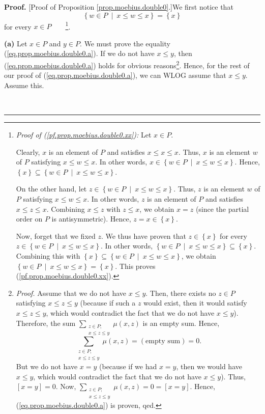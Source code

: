 \documentclass[numbers=enddot,12pt,final,onecolumn,notitlepage]{scrartcl}%
\theoremstyle{definition}
\newenvironment{proof}[1][Proof]{\noindent\textbf{#1.} }{\ \rule{0.5em}{0.5em}}
\newenvironment{verlong}{}{}
\let\sumnonlimits\sum
\renewcommand{\sum}{\sumnonlimits\limits}
\begin{document}
\begin{verlong}
\begin{proof}
[Proof of Proposition \ref{prop.moebius.double0}.]We first notice that%
\begin{equation}
\left\{  w\in P\ \mid\ x\leq w\leq x\right\}  =\left\{  x\right\}
\label{pf.prop.moebius.double0.xx}%
\end{equation}
for every $x\in P$\ \ \ \ \footnote{\textit{Proof of
(\ref{pf.prop.moebius.double0.xx}):} Let $x\in P$.
\par
Clearly, $x$ is an element of $P$ and satisfies $x\leq x\leq x$. Thus, $x$ is
an element $w$ of $P$ satisfying $x\leq w\leq x$. In other words,
$x\in\left\{  w\in P\ \mid\ x\leq w\leq x\right\}  $. Hence, $\left\{
x\right\}  \subseteq\left\{  w\in P\ \mid\ x\leq w\leq x\right\}  $.
\par
On the other hand, let $z\in\left\{  w\in P\ \mid\ x\leq w\leq x\right\}  $.
Thus, $z$ is an element $w$ of $P$ satisfying $x\leq w\leq x$. In other words,
$z$ is an element of $P$ and satisfies $x\leq z\leq x$. Combining $x\leq z$
with $z\leq x$, we obtain $x=z$ (since the partial order on $P$ is
antisymmetric). Hence, $z=x\in\left\{  x\right\}  $.
\par
Now, forget that we fixed $z$. We thus have proven that $z\in\left\{
x\right\}  $ for every $z\in\left\{  w\in P\ \mid\ x\leq w\leq x\right\}  $.
In other words, $\left\{  w\in P\ \mid\ x\leq w\leq x\right\}  \subseteq
\left\{  x\right\}  $. Combining this with $\left\{  x\right\}  \subseteq
\left\{  w\in P\ \mid\ x\leq w\leq x\right\}  $, we obtain $\left\{  w\in
P\ \mid\ x\leq w\leq x\right\}  =\left\{  x\right\}  $. This proves
(\ref{pf.prop.moebius.double0.xx}).}.

\textbf{(a)} Let $x\in P$ and $y\in P$. We must prove the equality
(\ref{eq.prop.moebius.double0.a}). If we do not have $x\leq y$, then
(\ref{eq.prop.moebius.double0.a}) holds for obvious
reasons\footnote{\textit{Proof.} Assume that we do not have $x\leq y$. Then,
there exists no $z\in P$ satisfying $x\leq z\leq y$ (because if such a $z$
would exist, then it would satisfy $x\leq z\leq y$, which would contradict the
fact that we do not have $x\leq y$). Therefore, the sum $\sum_{\substack{z\in
P;\\x\leq z\leq y}}\mu\left(  x,z\right)  $ is an empty sum. Hence,%
\[
\sum_{\substack{z\in P;\\x\leq z\leq y}}\mu\left(  x,z\right)  =\left(
\text{empty sum}\right)  =0.
\]
But we do not have $x=y$ (because if we had $x=y$, then we would have $x\leq
y$, which would contradict the fact that we do not have $x\leq y$). Thus,
$\left[  x=y\right]  =0$. Now, $\sum_{\substack{z\in P;\\x\leq z\leq y}%
}\mu\left(  x,z\right)  =0=\left[  x=y\right]  $. Hence,
(\ref{eq.prop.moebius.double0.a}) is proven, qed.}. Hence, for the rest of our
proof of (\ref{eq.prop.moebius.double0.a}), we can WLOG assume that $x\leq y$.
Assume this.


\end{proof}
\end{verlong}
\end{document}
